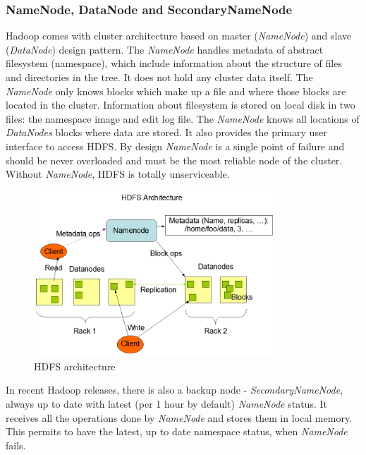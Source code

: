 \documentclass[a4paper,12pt,oneside]{report}
\begin{document}
	\subsubsection{NameNode, DataNode and SecondaryNameNode}
	Hadoop comes with cluster architecture based on master (\textit{NameNode}) and
	slave (\textit{DataNode}) design pattern. 
	The \textit{NameNode} handles metadata of abstract filesystem (namespace), which
	include
	information about the structure of files and directories in the tree.  It does
	not hold any cluster data itself. 
	The  \textit{NameNode} only knows blocks which make up a file and where those
	blocks are located in the cluster.
	Information about filesystem is stored on local disk in two files: the namespace
	image and edit log file. 
	The \textit{NameNode} knows all locations of  \textit{DataNodes} blocks where
	data 
	are stored. It also provides the primary user interface to access HDFS. 
	By design \textit{NameNode}  is a single point of failure and should be never
	overloaded and must 
	be the most reliable node of the cluster.  Without \textit{NameNode}, HDFS is
	totally unserviceable. 
	\begin{figure}[!htbp]
		\centering
		\includegraphics[width=0.8\textwidth]{./img/hdfsarchitecture.png}
		\caption[HDFS architecture]{\centering HDFS architecture \footnotemark}
		\label{hdfs_arch}
	\end{figure} 
	In recent Hadoop releases, there is also a backup node -
	\textit{SecondaryNameNode}, always up to date 
	with latest (per 1 hour by default) \textit{NameNode} status. It receives all the
	operations done by \textit{NameNode} and 
	stores them in local memory. This permits to have the latest, up to date
	namespace status, when \textit{NameNode} fails. 
	
\end{document}
